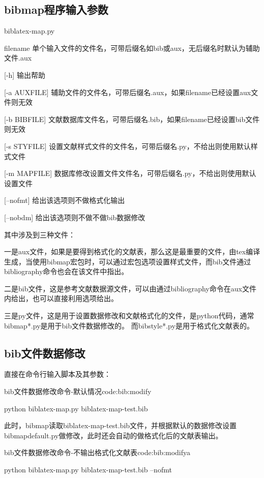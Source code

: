 \documentclass{article}
\begin{document}
\subsection{bibmap程序输入参数}

biblatex-map.py

filename 单个输入文件的文件名，可带后缀名如bib或aux，无后缀名时默认为辅助文件.aux

[-h] 输出帮助

[-a AUXFILE] 辅助文件的文件名，可带后缀名.aux，如果filename已经设置aux文件则无效

[-b BIBFILE] 文献数据库文件名，可带后缀名.bib，如果filename已经设置bib文件则无效

[-s STYFILE] 设置文献样式文件的文件名，可带后缀名.py，不给出则使用默认样式文件

[-m MAPFILE] 数据库修改设置文件文件名，可带后缀名.py，不给出则使用默认设置文件

[--nofmt] 给出该选项则不做格式化输出

[--nobdm] 给出该选项则不做不做bib数据修改

其中涉及到三种文件：

一是aux文件，如果是要得到格式化的文献表，那么这是最重要的文件，由tex编译生成，当使用bibmap宏包时，可以通过宏包选项设置样式文件，而bib文件通过bibliography命令也会在该文件中指出。

二是bib文件，这是参考文献数据源文件，可以由通过bibliography命令在aux文件内给出，也可以直接利用选项给出。

三是py文件，这是用于设置数据修改和文献格式化的文件，是python代码，通常bibmap*.py是用于bib文件数据修改的。
而bibstyle*.py是用于格式化文献表的。



\subsection{bib文件数据修改}

直接在命令行输入脚本及其参数：

\begin{example}{bib文件数据修改命令-默认情况}{code:bib:modify}
\begin{pycode}
python biblatex-map.py biblatex-map-test.bib
\end{pycode}
\end{example}

此时，bibmap读取biblatex-map-test.bib文件，并根据默认的数据修改设置bibmapdefault.py做修改，此时还会自动的做格式化后的文献表输出。

\begin{example}{bib文件数据修改命令-不输出格式化文献表}{code:bib:modifya}
\begin{pycode}
python biblatex-map.py biblatex-map-test.bib --nofmt
\end{pycode}
\end{example}
\end{document}
